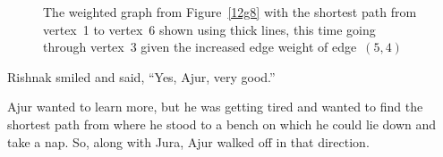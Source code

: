 \begin{figure}
\begin{center}
\caption{The weighted graph from Figure~\ref{12g8} with the shortest path from vertex~1 to vertex~6 shown using thick lines, this time going through vertex~3 given the increased edge weight of edge~$(5,4)$}\label{12qa1}
\end{center}
\end{figure}

Rishnak smiled and said, ``Yes, Ajur, very good.''

Ajur wanted to learn more, but he was getting tired and wanted to find the shortest path from where he stood to a bench on which he could lie down and take a nap. So, along with Jura, Ajur walked off in that direction.